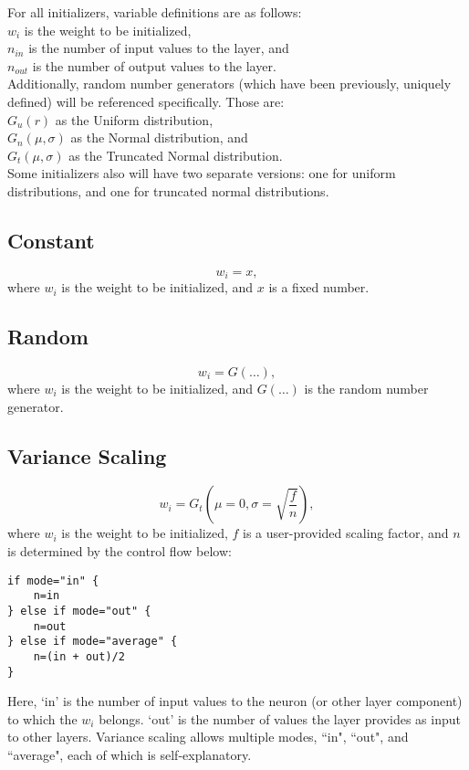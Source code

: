 \documentclass[fleqn]{article}
\begin{document}
For all initializers, variable definitions are as follows:\\
\hspace*{6mm} $w_i$ is the weight to be initialized,\\
\hspace*{6mm} $n_{in}$ is the number of input values to the layer, and\\
\hspace*{6mm} $n_{out}$ is the number of output values to the layer.\\
Additionally, random number generators (which have been previously,
uniquely defined) will be referenced specifically. Those are:\\
\hspace*{6mm} $G_u(r)$ as the Uniform distribution,\\
\hspace*{6mm} $G_n(\mu, \sigma)$ as the Normal distribution, and\\
\hspace*{6mm} $G_t(\mu, \sigma)$ as the Truncated Normal distribution.\\
Some initializers also will have two separate versions: one for uniform
distributions, and one for truncated normal distributions.

\subsection{Constant}
\[ w_i = x, \]
where $w_i$ is the weight to be initialized, and $x$ is a fixed number.

\subsection{Random}
\[ w_i = G(\dots), \]
where $w_i$ is the weight to be initialized, and $G(\dots)$ is the random
number generator.

\subsection{Variance Scaling}
\[ w_i = G_t(\mu=0, \sigma=\sqrt{\frac{f}{n}}), \]
where $w_i$ is the weight to be initialized, $f$ is a user-provided
scaling factor, and $n$ is determined by the control flow below:
\begin{verbatim}
if mode="in" {
    n=in
} else if mode="out" {
    n=out
} else if mode="average" {
    n=(in + out)/2
}
\end{verbatim}
Here, `in' is the number of input values to the neuron (or other layer
component) to which the $w_i$ belongs. `out' is the number of values the
layer provides as input to other layers. Variance scaling allows multiple
modes, ``in", ``out", and ``average", each of which is self-explanatory.
\end{document}
